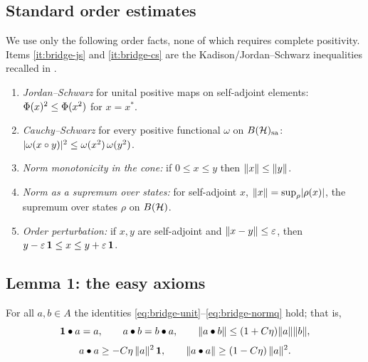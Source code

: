 \subsection*{Standard order estimates}

We use only the following order facts, none of which requires complete
positivity. Items \ref{it:bridge-js} and \ref{it:bridge-cs} are the
Kadison/Jordan--Schwarz inequalities recalled in 
\cite{Kadison1952,vanLuijkWilming2026}.
\begin{enumerate}[label=\textup{(O\arabic*)},leftmargin=*]
  \item\label{it:bridge-js}
    \emph{Jordan--Schwarz} for unital positive maps on self-adjoint elements:
    $\Phi(x)^2\le\Phi(x^2)$ for $x=x^*$.
  \item\label{it:bridge-cs}
    \emph{Cauchy--Schwarz} for every positive functional $\omega$ on
    $B(\mathcal{H})_{\mathrm{sa}}$: $\lvert\omega(x\circ y)\rvert^2\le\omega(x^2)\,\omega(y^2)$.
  \item\label{it:bridge-mono}
    \emph{Norm monotonicity in the cone:} if $0\le x\le y$ then
    $\lVert x \rVert\le\lVert y \rVert$.
  \item\label{it:bridge-sup}
    \emph{Norm as a supremum over states:} for self-adjoint $x$,
    $\lVert x \rVert=\sup_\rho\lvert\rho(x)\rvert$, the supremum over states $\rho$ on
    $B(\mathcal{H})$.
  \item\label{it:bridge-pert}
    \emph{Order perturbation:} if $x,y$ are self-adjoint and
    $\lVert x-y \rVert\le\varepsilon$, then $y-\varepsilon\,\mathbf{1}\le x\le y+\varepsilon\,\mathbf{1}$.
\end{enumerate}

\subsection*{Lemma 1: the easy axioms}

\begin{lemma}\label{lem:bridge-easy}
For all $a,b\in A$ the identities \eqref{eq:bridge-unit}--\eqref{eq:bridge-normq}
hold; that is,
\[
  \mathbf{1}\bullet a=a,\qquad a\bullet b=b\bullet a,\qquad
  \lVert a\bullet b \rVert\le(1+C\eta)\lVert a \rVert\lVert b \rVert,
\]
\[
  a\bullet a\ge-C\eta\,\lVert a \rVert^2\,\mathbf{1},\qquad
  \lVert a\bullet a \rVert\ge(1-C\eta)\,\lVert a \rVert^2.
\]
\end{lemma}

